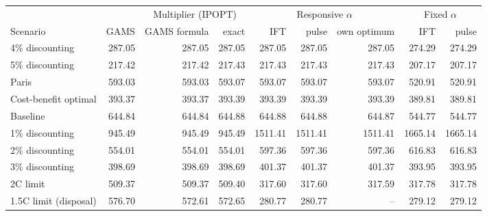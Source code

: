 \begin{tabular}{lrrrrrrrr}
\toprule
 & & \multicolumn{2}{c}{Multiplier (IPOPT)} & \multicolumn{3}{c}{Responsive $\alpha$} & \multicolumn{2}{c}{Fixed $\alpha$} \\
\cmidrule(lr){3-4}\cmidrule(lr){5-7}\cmidrule(lr){8-9}
Scenario & GAMS & GAMS formula & exact & IFT & pulse & own optimum & IFT & pulse \\
\midrule
4\% discounting & 287.05 & 287.05 & 287.05 & 287.05 & 287.05 & 287.05 & 274.29 & 274.29 \\
5\% discounting & 217.42 & 217.42 & 217.43 & 217.43 & 217.43 & 217.43 & 207.17 & 207.17 \\
Paris & 593.03 & 593.03 & 593.07 & 593.07 & 593.07 & 593.07 & 520.91 & 520.91 \\
Cost-benefit optimal & 393.37 & 393.37 & 393.39 & 393.39 & 393.39 & 393.39 & 389.81 & 389.81 \\
Baseline & 644.84 & 644.84 & 644.88 & 644.88 & 644.88 & 644.87 & 544.77 & 544.77 \\
\midrule
1\% discounting & 945.49 & 945.49 & 945.49 & 1511.41 & 1511.41 & 1511.41 & 1665.14 & 1665.14 \\
2\% discounting & 554.01 & 554.01 & 554.01 & 597.36 & 597.36 & 597.36 & 616.83 & 616.83 \\
3\% discounting & 398.69 & 398.69 & 398.69 & 401.37 & 401.37 & 401.37 & 393.95 & 393.95 \\
2\textdegree{}C limit & 509.37 & 509.37 & 509.40 & 317.60 & 317.60 & 317.59 & 317.78 & 317.78 \\
1.5\textdegree{}C limit (disposal) & 576.70 & 572.61 & 572.65 & 280.77 & 280.77 & -- & 279.12 & 279.12 \\
\bottomrule
\end{tabular}
